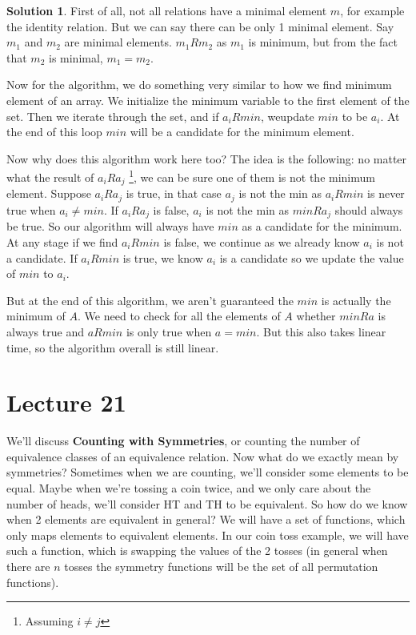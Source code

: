 \documentclass[a4paper,10pt]{article}
\theoremstyle{definition} %
\newtheorem*{solution}{Solution}
\begin{document}
    \begin{solution}
        First of all, not all relations have a minimal element $m$, for example the identity relation. But we can say there can 
        be only 1 minimal element. Say $m_1$ and $m_2$ are minimal elements. $m_1Rm_2$ as $m_1$ is minimum, but from the fact
        that $m_2$ is minimal, $m_1 = m_2$.

        Now for the algorithm, we do something very similar to how we find minimum element of an array. We initialize the minimum
        variable to the first element of the set. Then we iterate through the set, and if $a_iRmin$, weupdate $min$ to be $a_i$. 
        At the end of this loop $min$ will be a candidate for the minimum element. 

        Now why does this algorithm work here too? The idea is the following: no matter what the result of $a_iRa_j$ \footnote{Assuming $i \neq j$}, we can be sure
        one of them is not the minimum element. Suppose $a_iRa_j$ is true, in that case $a_j$ is not the min as $a_iRmin$ is never true when $a_i \neq min$. If 
        $a_iRa_j$ is false, $a_i$ is not the min as $minRa_j$ should always be true. So our algorithm will always have $min$ as a candidate for the minimum. At any 
        stage if we find $a_iRmin$ is false, we continue as we already know $a_i$ is not a candidate. If $a_iRmin$ is true, we know $a_i$ is a candidate so we update 
        the value of $min$ to $a_i$.

        But at the end of this algorithm, we aren't guaranteed the $min$ is actually the minimum of $A$. We need to check for all the elements of $A$ whether $minRa$
        is always true and $aRmin$ is only true when $a = min$. But this also takes linear time, so the algorithm overall is still linear.
    \end{solution}

    \section{Lecture 21}
    We'll discuss \textbf{Counting with Symmetries}, or counting the number of equivalence classes of an equivalence relation. Now what do we exactly 
    mean by symmetries? Sometimes when we are counting, we'll consider some elements to be equal. Maybe when we're tossing a coin twice, and we only care
    about the number of heads, we'll consider HT and TH to be equivalent. So how do we know when 2 elements are equivalent in general? We will have a set of 
    functions, which only maps elements to equivalent elements. In our coin toss example, we will have such a function, which is swapping the values of the 2 
    tosses (in general when there are $n$ tosses the symmetry functions will be the set of all permutation functions).
\end{document}
